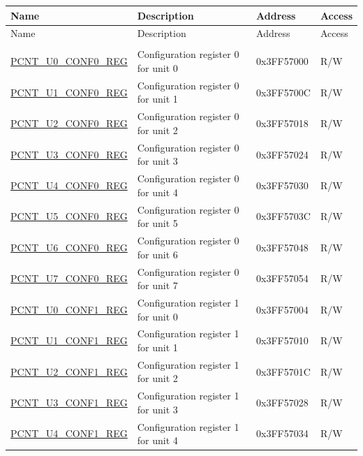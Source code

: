 \begin{longtable}{ | p{5cm} | p{7cm} | p{2cm} | p{1cm} | }
\hline\rowcolor{lightgray}
Name & Description &  Address & Access \\ \hline
\endfirsthead
        \hline
        \rowcolor{lightgray}
       Name & Description &  Address & Access \\
        \hline
        \endhead
        \endfoot
\multicolumn{4}{|l|}{\textbf{Configuration registers}} \\ \hline
\hyperref[regdesc:PCNTUnCONF0REG]{PCNT\_U0\_CONF0\_REG} & Configuration register 0 for unit 0 & 0x3FF57000 & R/W \\ \hline
\hyperref[regdesc:PCNTUnCONF0REG]{PCNT\_U1\_CONF0\_REG} & Configuration register 0 for unit 1 & 0x3FF5700C & R/W \\ \hline
\hyperref[regdesc:PCNTUnCONF0REG]{PCNT\_U2\_CONF0\_REG} & Configuration register 0 for unit 2 & 0x3FF57018 & R/W \\ \hline
\hyperref[regdesc:PCNTUnCONF0REG]{PCNT\_U3\_CONF0\_REG} & Configuration register 0 for unit 3 & 0x3FF57024 & R/W \\ \hline
\hyperref[regdesc:PCNTUnCONF0REG]{PCNT\_U4\_CONF0\_REG} & Configuration register 0 for unit 4 & 0x3FF57030 & R/W \\ \hline
\hyperref[regdesc:PCNTUnCONF0REG]{PCNT\_U5\_CONF0\_REG} & Configuration register 0 for unit 5 & 0x3FF5703C & R/W \\ \hline
\hyperref[regdesc:PCNTUnCONF0REG]{PCNT\_U6\_CONF0\_REG} & Configuration register 0 for unit 6 & 0x3FF57048 & R/W \\ \hline
\hyperref[regdesc:PCNTUnCONF0REG]{PCNT\_U7\_CONF0\_REG} & Configuration register 0 for unit 7 & 0x3FF57054 & R/W \\ \hline
\hyperref[regdesc:PCNTUnCONF1REG]{PCNT\_U0\_CONF1\_REG} & Configuration register 1 for unit 0 & 0x3FF57004 & R/W \\ \hline
\hyperref[regdesc:PCNTUnCONF1REG]{PCNT\_U1\_CONF1\_REG} & Configuration register 1 for unit 1 & 0x3FF57010 & R/W \\ \hline
\hyperref[regdesc:PCNTUnCONF1REG]{PCNT\_U2\_CONF1\_REG} & Configuration register 1 for unit 2 & 0x3FF5701C & R/W \\ \hline
\hyperref[regdesc:PCNTUnCONF1REG]{PCNT\_U3\_CONF1\_REG} & Configuration register 1 for unit 3 & 0x3FF57028 & R/W \\ \hline
\hyperref[regdesc:PCNTUnCONF1REG]{PCNT\_U4\_CONF1\_REG} & Configuration register 1 for unit 4 & 0x3FF57034 & R/W \\ \hline

\end{longtable}
